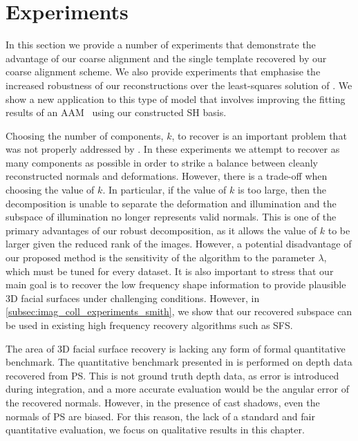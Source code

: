 \section{Experiments}\label{sec:imag_coll_experiments}
In this section we provide a number of experiments that demonstrate the
advantage of our coarse alignment and the single template recovered by our
coarse alignment scheme. We also provide experiments that emphasise the increased
robustness of our reconstructions over the least-squares solution of
\citet{KemelmacherShlizerman:2013iv}. We show a new application to this type
of model that involves improving the fitting results of an 
AAM~\cite{cootes2001active} using our
constructed SH basis. 

Choosing the number of components, $k$, to recover is an
important problem that was not properly addressed by \citet{KemelmacherShlizerman:2013iv}. 
In these experiments we attempt to recover as many
components as possible in order to strike a balance between cleanly
reconstructed normals and deformations. However, there is a trade-off when choosing
the value of $k$. In particular, if the value of $k$ is too large, then the
decomposition is unable to separate the deformation and illumination and the subspace of
illumination no longer represents valid normals. This is one of the primary advantages
of our robust decomposition, as it allows the value of $k$ to be larger given
the reduced rank of the images. However, a potential disadvantage of our
proposed method is the sensitivity of the algorithm to the parameter $\lambda$,
which must be tuned for every dataset. It is also important to stress that our
main goal is to recover the low frequency shape information to provide plausible
3D facial surfaces under challenging conditions. However, in
\cref{subsec:imag_coll_experiments_smith}, we show that our recovered subspace can
be used in existing high frequency recovery algorithms such as SFS.\@

The area of 3D facial surface recovery is lacking any form of formal
quantitative benchmark. The quantitative benchmark presented in
\cite{KemelmacherShlizerman:2013iv} is performed on depth data recovered from PS.\@
This is not ground truth depth data, as error is introduced during
integration, and a more accurate evaluation would be the angular error of the
recovered normals. However, in the presence of cast shadows, even the normals of
PS are biased. For this reason, the lack of a standard and fair
quantitative evaluation, we focus on qualitative results in this chapter.

